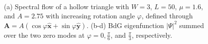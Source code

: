 \documentclass[aps,prb,showpacs,amsmath,amssymb,superscriptaddress]{revtex4-2}
\let\oldhat\hat
\renewcommand{\hat}[1]{\oldhat{\mathbf{#1}}}
\begin{document}
\begin{figure}
   \\
  \caption{(a) Spectral flow of a hollow triangle with $W=3$, $L=50$, $\mu=1.6$,       and $A=2.75$ with increasing rotation angle $\varphi$, defined through $\mathbf A = A(\cos\varphi \hat{x} + \sin\varphi \hat{y})$. (b-d) BdG eigenfunction $|\Psi|^2$ summed over the two zero modes at $\varphi = 0, \frac{\pi}{6}$, and $\frac{\pi}{3}$, respectively.}
  \label{fig: supp rotation}
\end{figure}
\end{document}
